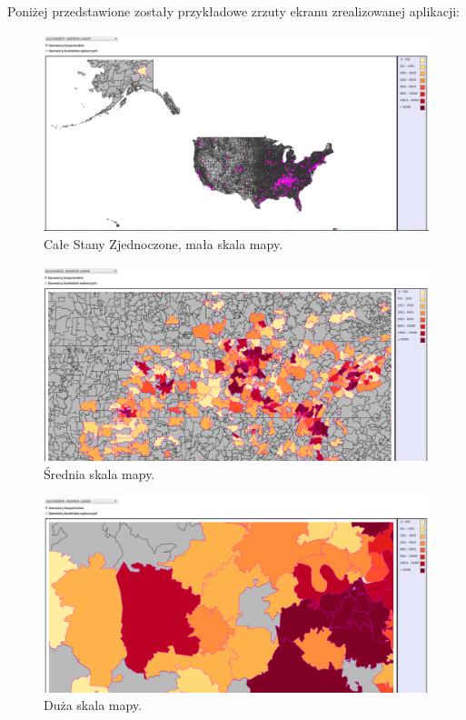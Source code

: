 \documentclass[10pt,a4paper]{article}
\begin{document}
Poniżej przedstawione zostały przykładowe zrzuty ekranu zrealizowanej aplikacji:
\begin{figure}[H]
    \centering
    \includegraphics[width=1.0\textwidth]{whole.png}
    \caption{Całe Stany Zjednoczone, mała skala mapy.}
\end{figure}
\begin{figure}[H]
    \centering
    \includegraphics[width=1\textwidth]{medium.png}
    \caption{Średnia skala mapy.}
\end{figure}
\begin{figure}[H]
    \centering
    \includegraphics[width=1\textwidth]{small.png}
    \caption{Duża skala mapy.}
\end{figure}
\end{document}
